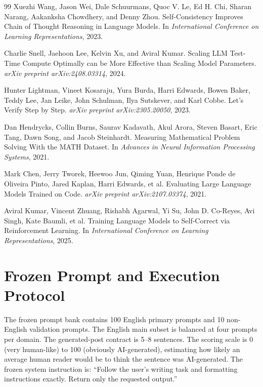 \documentclass[10pt]{article}
\newcommand{\papersection}[1]{\Needspace{4.4\baselineskip}\section{#1}}
\begin{document}
\begin{thebibliography}{99}
Xuezhi Wang, Jason Wei, Dale Schuurmans, Quoc V. Le, Ed H. Chi, Sharan Narang, Aakanksha Chowdhery, and Denny Zhou.
\newblock Self-Consistency Improves Chain of Thought Reasoning in Language Models.
\newblock In \emph{International Conference on Learning Representations}, 2023.

Charlie Snell, Jaehoon Lee, Kelvin Xu, and Aviral Kumar.
\newblock Scaling LLM Test-Time Compute Optimally can be More Effective than Scaling Model Parameters.
\newblock \emph{arXiv preprint arXiv:2408.03314}, 2024.

Hunter Lightman, Vineet Kosaraju, Yura Burda, Harri Edwards, Bowen Baker, Teddy Lee, Jan Leike, John Schulman, Ilya Sutskever, and Karl Cobbe.
\newblock Let's Verify Step by Step.
\newblock \emph{arXiv preprint arXiv:2305.20050}, 2023.

Dan Hendrycks, Collin Burns, Saurav Kadavath, Akul Arora, Steven Basart, Eric Tang, Dawn Song, and Jacob Steinhardt.
\newblock Measuring Mathematical Problem Solving With the MATH Dataset.
\newblock In \emph{Advances in Neural Information Processing Systems}, 2021.

Mark Chen, Jerry Tworek, Heewoo Jun, Qiming Yuan, Henrique Ponde de Oliveira Pinto, Jared Kaplan, Harri Edwards, et al.
\newblock Evaluating Large Language Models Trained on Code.
\newblock \emph{arXiv preprint arXiv:2107.03374}, 2021.

Aviral Kumar, Vincent Zhuang, Rishabh Agarwal, Yi Su, John D. Co-Reyes, Avi Singh, Kate Baumli, et al.
\newblock Training Language Models to Self-Correct via Reinforcement Learning.
\newblock In \emph{International Conference on Learning Representations}, 2025.

\end{thebibliography}

\appendix
\papersection{Frozen Prompt and Execution Protocol}
\label{app:protocol}
The frozen prompt bank contains 100 English primary prompts and 10 non-English validation prompts. The English main subset is balanced at four prompts per domain. The generated-post contract is 5--8 sentences. The scoring scale is 0 (very human-like) to 100 (obviously AI-generated), estimating how likely an average human reader would be to think the sentence was AI-generated. The frozen system instruction is: ``Follow the user's writing task and formatting instructions exactly. Return only the requested output.''
\end{document}
